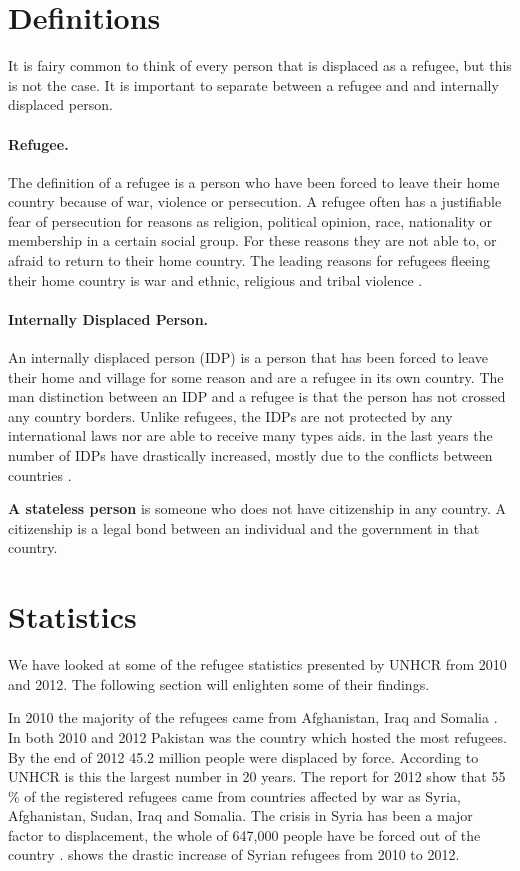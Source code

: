 \section{Definitions}
It is fairy common to think of every person that is displaced as a refugee, but this is not the case. It is important to separate between a refugee and and internally displaced person. 

\paragraph{Refugee.} The definition of a refugee is a person who have been forced to leave their home country because of war, violence or persecution. A refugee often has a justifiable fear of persecution for reasons as religion, political opinion, race, nationality or membership in a certain social group. For these reasons they are not able to, or
afraid to return to their home country. The leading reasons for refugees fleeing their home country is war and ethnic, religious and tribal violence \cite{refugeeDef}.

\paragraph{Internally Displaced Person.} An internally displaced person (IDP) is a person that has been forced to leave their home and village for some reason and are a refugee in its own country. The man distinction between an IDP and a refugee is that the person has not crossed any country borders. Unlike refugees, the IDPs are not protected by any international laws nor are able to receive many types aids. in the last years the number of IDPs have drastically increased, mostly due to the conflicts between countries \cite{refugeeDef}. 

\textbf{A stateless person} is someone who does not have citizenship in any country. A citizenship is a legal bond between an individual and the government in that country. 

\section{Statistics}
We have looked at some of the refugee statistics presented by UNHCR from 2010 and 2012. The following section will enlighten some of their findings. 

In 2010 the majority of the refugees came from Afghanistan, Iraq and Somalia \cite{UNHCRstat2010}. In both 2010 and 2012 Pakistan was the country which hosted the most refugees. By the end of 2012 45.2 million people were displaced by force. According to UNHCR is this the largest number in 20 years. The report for 2012 show that 55 \% of the registered refugees came from countries affected by war as Syria, Afghanistan, Sudan, Iraq and Somalia.  The crisis in Syria has been a major factor to displacement, the whole of 647,000 people have be forced out of the country \cite{UNHCRstat2012}.  shows the drastic increase of Syrian refugees from 2010 to 2012. 

